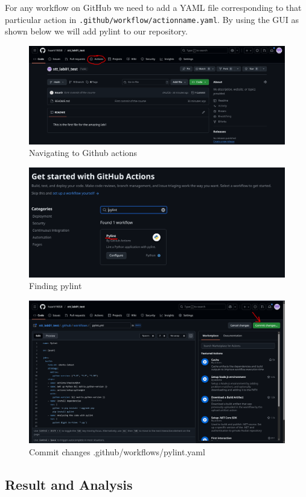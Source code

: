 \documentclass[a4paper,12pt,twoside,english]{all-in-one} %
\begin{document}
For any workflow on GitHub we need to add a YAML file corresponding to that particular action in \texttt{.github/workflow/actionname.yaml}. By using the GUI as shown below we will add pylint to our repository.


\begin{figure}[H]
    \centering
    \includegraphics[width=0.75\linewidth]{image13.png}
    \caption{Navigating to Github actions}
    \label{fig:placeholder}
\end{figure}

\begin{figure}[H]
    \centering
    \includegraphics[width=0.75\linewidth]{image14.png}
    \caption{Finding pylint}
    \label{fig:placeholder}
\end{figure}

\begin{figure}[H]
    \centering
    \includegraphics[width=0.75\linewidth]{image15.png}
    \caption{Commit changes .github/workflows/pylint.yaml}
    \label{fig:placeholder}
\end{figure}

\subsection{Result and Analysis}
\end{document}
